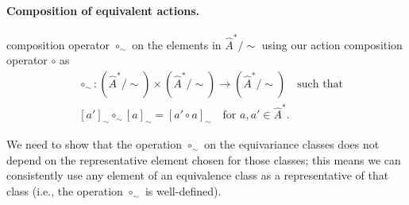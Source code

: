 \paragraph{Composition of equivalent actions.}
 composition operator $\circ_{\sim}$ on the elements in $\hat{A}^{\ast}/\sim$ using our action composition operator $\circ$ as
\begin{equation}
	\begin{aligned}
		 & \circ_{\sim}: (\hat{A}^{\ast}/\sim) \times (\hat{A}^{\ast}/\sim) \to (\hat{A}^{\ast}/\sim) \quad \text{such that} \\
		 & [a']_{\sim} \circ_{\sim} [a]_{\sim} = [a' \circ a]_{\sim} \quad \text{for $a,a' \in \hat{A}^{\ast}$}.
	\end{aligned}
\end{equation}

We need to show that the operation $\circ_{\sim}$ on the equivariance classes does not depend on the representative element chosen for those classes; this means we can consistently use any element of an equivalence class as a representative of that class (i.e., the operation $\circ_{\sim}$ is well-defined).

